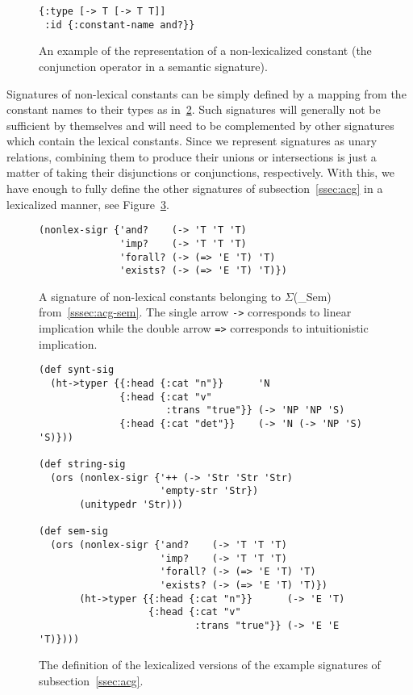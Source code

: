 \begin{figure}
  \centering
\begin{verbatim}
{:type [-> T [-> T T]]
 :id {:constant-name and?}}
\end{verbatim}
  \caption{\label{fig:nonlex-const} An example of the representation of
    a non-lexicalized constant (the conjunction operator in a semantic
    signature).}
\end{figure}

Signatures of non-lexical constants can be simply defined by a mapping
from the constant names to their types as
in~\ref{fig:nonlex-sig-impl}. Such signatures will generally not be
sufficient by themselves and will need to be complemented by other
signatures which contain the lexical constants. Since we represent
signatures as unary relations, combining them to produce their unions or
intersections is just a matter of taking their disjunctions or
conjunctions, respectively. With this, we have enough to fully define
the other signatures of subsection~\ref{ssec:acg} in a lexicalized
manner, see Figure~\ref{fig:example-sig-impl}.

\begin{figure}
  \centering
\begin{verbatim}
(nonlex-sigr {'and?    (-> 'T 'T 'T)
              'imp?    (-> 'T 'T 'T)
              'forall? (-> (=> 'E 'T) 'T)
              'exists? (-> (=> 'E 'T) 'T)})
\end{verbatim}
  \caption{\label{fig:nonlex-sig-impl} A signature of non-lexical
    constants belonging to $\Sigma$(\_{Sem})
    from~\ref{sssec:acg-sem}. The single arrow \texttt{->} corresponds
    to linear implication while the double arrow \texttt{=>} corresponds
    to intuitionistic implication.}
\end{figure}

\begin{figure}
  \centering
\begin{verbatim}
(def synt-sig
  (ht->typer {{:head {:cat "n"}}      'N
              {:head {:cat "v"
                      :trans "true"}} (-> 'NP 'NP 'S)
              {:head {:cat "det"}}    (-> 'N (-> 'NP 'S) 'S)}))

(def string-sig
  (ors (nonlex-sigr {'++ (-> 'Str 'Str 'Str)
                     'empty-str 'Str})
       (unitypedr 'Str)))

(def sem-sig
  (ors (nonlex-sigr {'and?    (-> 'T 'T 'T)
                     'imp?    (-> 'T 'T 'T)
                     'forall? (-> (=> 'E 'T) 'T)
                     'exists? (-> (=> 'E 'T) 'T)})
       (ht->typer {{:head {:cat "n"}}      (-> 'E 'T)
                   {:head {:cat "v"
                           :trans "true"}} (-> 'E 'E 'T)})))
\end{verbatim}
  \caption{\label{fig:example-sig-impl} The definition of the
    lexicalized versions of the example signatures of
    subsection~\ref{ssec:acg}.}
\end{figure}

